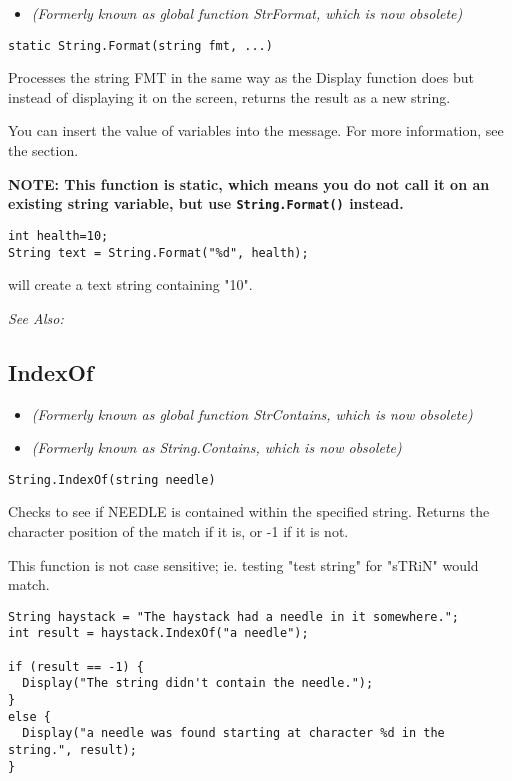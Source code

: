 \begin{itemize}
\item \it{(Formerly known as global function StrFormat, which is now obsolete)}
\end{itemize}

\begin{verbatim}
static String.Format(string fmt, ...)
\end{verbatim}
Processes the string FMT in the same way as the Display function does but
instead of displaying it on the screen, returns the result as a new string.

You can insert the value of variables into the message. For more information,
see the  section.

\bf{NOTE:} This function is static, which means you do not call it on
an existing string variable, but use \verb$String.Format()$ instead.

\begin{verbatim}
int health=10;
String text = String.Format("%d", health);
\end{verbatim}
will create a text string containing "10".

\it{See Also:} 


\subsection{IndexOf}\label{String.IndexOf}%

\begin{itemize}
\item \it{(Formerly known as global function StrContains, which is now obsolete)}
\item \it{(Formerly known as String.Contains, which is now obsolete)}
\end{itemize}

\begin{verbatim}
String.IndexOf(string needle)
\end{verbatim}
Checks to see if NEEDLE is contained within the specified string. Returns the character position
of the match if it is, or -1 if it is not.

This function is not case sensitive; ie. testing "test string" for "sTRiN" would match.

\begin{verbatim}
String haystack = "The haystack had a needle in it somewhere.";
int result = haystack.IndexOf("a needle");

if (result == -1) {
  Display("The string didn't contain the needle.");
}
else {
  Display("a needle was found starting at character %d in the string.", result);
}
\end{verbatim}

